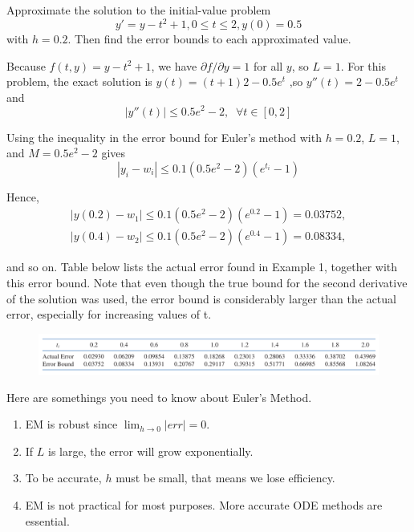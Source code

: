 \begin{ex}
	Approximate the solution to the initial-value problem
	\[ y' = y - t^2 + 1, 0 \leq t \leq 2, y(0) = 0.5 \]
	with $h=0.2$. Then find the error bounds to each approximated value.
	
	\begin{solution}
		Because $f(t, y) = y - t^2 + 1$, we have $\partial f/\partial y = 1$ for all $y$, so $L = 1$. For this problem, the exact solution is $y(t) = (t + 1)2 - 0.5e^t$ ,so $y''(t) = 2 - 0.5e^t$ and
		\[ |y''(t)| \leq 0.5e^2 - 2,\;\; \forall t\in [0,2] \]
		
		Using the inequality in the error bound for Euler’s method with $h = 0.2$, $L = 1$, and $M = 0.5e^2 - 2$ gives
		\[ |y_i - w_i| \leq 0.1(0.5e^2 - 2)(e^{t_i} - 1) \]
		
		Hence,
		\begin{align*}
		|y(0.2) - w_1|\leq 0.1(0.5e^2 - 2)(e^{0.2} - 1) = 0.03752,\\
		|y(0.4) - w_2|\leq 0.1(0.5e^2 - 2)(e^{0.4} - 1) = 0.08334,
		\end{align*}
		
		and so on. Table below lists the actual error found in Example 1, together with this error bound. Note that even though the true bound for the second derivative of the solution was used, the error bound is considerably larger than the actual error, especially for increasing values of t.
		
		\begin{figure}[H]
			\centering
			\includegraphics*[width=\linewidth]{img/chapter8table.PNG}
		\end{figure}
	\end{solution}
\end{ex}

\begin{summary}
	Here are somethings you need to know about Euler's Method.
	\begin{enumerate}
		\item 
		EM is robust since $\lim_{h\to 0}|err| = 0$.
		
		\item 
		If $L$ is large, the error will grow exponentially.
		
		\item 
		To be accurate, $h$ must be small, that means we lose efficiency.
		
		\item 
		EM is not practical for most purposes. More accurate ODE methods are essential. 
	\end{enumerate}
\end{summary}

